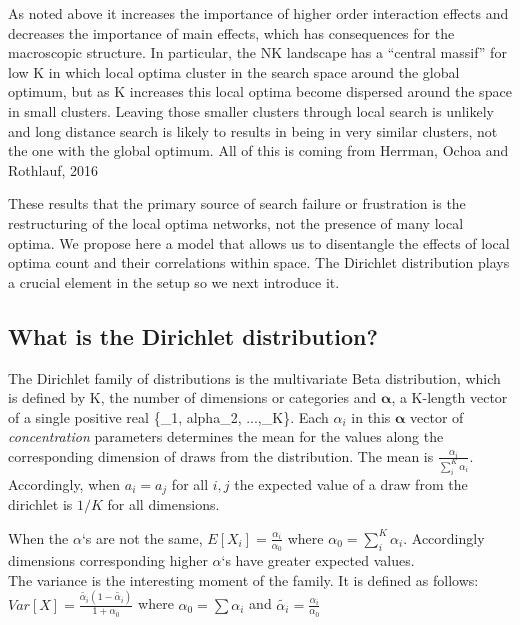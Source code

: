 \documentclass[12pt]{article}
\begin{document}
As noted above it increases the importance of higher order interaction effects and decreases the importance of main effects, which has consequences for the macroscopic structure. In particular, the NK landscape has a ``central massif'' for low K in which local optima cluster in the search space around the global optimum, but as K increases this local optima become dispersed around the space in small clusters. Leaving those smaller clusters through local search is unlikely and long distance search is likely to results in being in very similar clusters, not the one with the global optimum. {All of this is coming from Herrman, Ochoa and Rothlauf, 2016}

These results that the primary source of search failure or frustration is the restructuring of the local optima networks, not the presence of many local optima. We propose here a model that allows us to disentangle the effects of local optima count and their correlations within space. The Dirichlet distribution plays a crucial element in the setup so we next introduce it.

\subsection*{What is the Dirichlet distribution?}

The Dirichlet family of distributions is the multivariate Beta distribution, which is defined by K, the number of dimensions or categories and $\boldsymbol\alpha$, a K-length vector of a single positive real \{\alpha_1, alpha_2, ...,\alpha_K\}.  Each $\alpha_i$ in this $\boldsymbol\alpha$ vector of \textit{concentration} parameters determines the mean for the values along the corresponding dimension of draws from the distribution. The mean is  $\frac{\alpha_i}{\sum_{i}^{K} \alpha_i}$. Accordingly, when $a_i = a_j$ for all $i, j$  the expected value of a draw from the dirichlet is $1/K$ for all dimensions.

When the $\alpha$`s are not the same, $E[X_i] = \frac{\alpha_i}{\alpha_0}$ where $\alpha_0 = \sum_{i}^{K} \alpha_i$. Accordingly dimensions corresponding higher $\alpha$`s have greater expected values.\\

The variance is the interesting moment of the family. It is defined as follows:
$Var[X] = \frac{\tilde{\alpha_i}(1-\tilde{\alpha_i})}{1 + \alpha_0}$
where $\alpha_0 = \sum{\alpha_i}$ and $\tilde{\alpha_i} = \frac{\alpha_i}{\alpha_0}$\\
\end{document}
